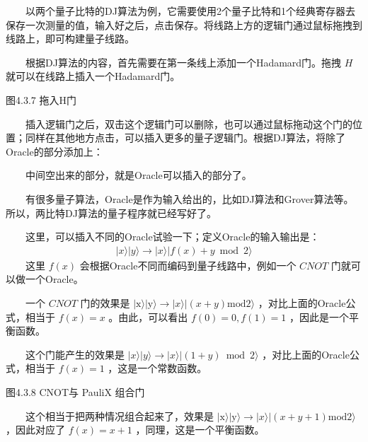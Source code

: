 \documentclass[a4paper,11pt,english]{sphinxmanual}
\begin{document}
\sphinxAtStartPar
  以两个量子比特的D\sphinxhyphen{}J算法为例，它需要使用2个量子比特和1个经典寄存器去保存一次测量的值，输入好之后，点击保存。将线路上方的逻辑门通过鼠标拖拽到线路上，即可构建量子线路。

\sphinxAtStartPar
  根据D\sphinxhyphen{}J算法的内容，首先需要在第一条线上添加一个Hadamard门。拖拽 \(H\) 就可以在线路上插入一个Hadamard门。


\begin{center}图4.3.7 拖入H门
\end{center}
\sphinxAtStartPar
  插入逻辑门之后，双击这个逻辑门可以删除，也可以通过鼠标拖动这个门的位置；同样在其他地方点击，可以插入更多的量子逻辑门。根据DJ算法，将除了Oracle的部分添加上：

\sphinxAtStartPar
  中间空出来的部分，就是Oracle可以插入的部分了。

\sphinxAtStartPar
  有很多量子算法，Oracle是作为输入给出的，比如DJ算法和Grover算法等。所以，两比特DJ算法的量子程序就已经写好了。

\sphinxAtStartPar
  这里，可以插入不同的Oracle试验一下；定义Oracle的输入输出是：
\begin{equation*}
\begin{split}|x\rangle|y\rangle \rightarrow|x\rangle|f(x)+y \bmod 2\rangle\end{split}
\end{equation*}
\sphinxAtStartPar
  这里 \(f(x)\) 会根据Oracle不同而编码到量子线路中，例如一个 \(CNOT\) 门就可以做一个Oracle。

\sphinxAtStartPar
  一个 \(CNOT\) 门的效果是 \(|\mathrm{x}\rangle|\mathrm{y}\rangle \rightarrow|x\rangle|(x+y) \mathrm{mod} 2\rangle\) ，对比上面的Oracle公式，相当于 \(f(x)=x\) 。由此，可以看出 \(f(0)=0, f(1)=1\) ，因此是一个平衡函数。

\sphinxAtStartPar
  这个门能产生的效果是 \(|x\rangle|y\rangle \rightarrow|x\rangle|(1+y) \bmod 2\rangle\) ，对比上面的Oracle公式，相当于 \(f(x)=1\) ，这是一个常数函数。


\begin{center}图4.3.8 CNOT与 Pauli\sphinxhyphen{}X 组合门
\end{center}
\sphinxAtStartPar
  这个相当于把两种情况组合起来了，效果是  \(|\mathrm{x}\rangle|\mathrm{y}\rangle \rightarrow|x\rangle|(x+y+1) \mathrm{mod} 2\rangle\) ，因此对应了 \(f(x)=x+1\) ，同理，这是一个平衡函数。
\end{document}
